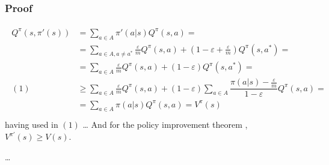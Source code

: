 \documentclass[letterpaper,10pt,english]{jupyterBook}
\begin{document}
\subsubsection*{Proof}
\begin{equation*}
\begin{split}\begin{aligned}
  Q^{\pi}(s, \pi'(s))
  & = \sum_{a \in A} \pi'(a|s) Q^{\pi}(s,a) = \\
  & = \sum_{a \in A, a \ne a^*} \frac{\varepsilon}{m} Q^{\pi}(s,a) + \left( 1 - \varepsilon + \frac{\varepsilon}{m} \right) Q^{\pi}(s,a^*) = \\
  & = \sum_{a \in A} \frac{\varepsilon}{m} Q^{\pi}(s,a) + \left( 1 - \varepsilon \right) Q^{\pi}(s,a^*) = \\
  (1) & \ge \sum_{a \in A} \frac{\varepsilon}{m} Q^{\pi}(s,a) + \left( 1 - \varepsilon \right) \sum_{a \in A} \dfrac{\pi(a|s) - \frac{\varepsilon}{m}}{1 - \varepsilon} Q^{\pi}(s,a) = \\
  & = \sum_{a \in A} \pi(a|s) Q^{\pi}(s,a) = V^{\pi}(s) \\
\end{aligned}\end{split}
\end{equation*}
\sphinxAtStartPar
having used in \((1)\) …
And for the policy improvement theorem {\hyperref[\detokenize{ch/rl/mdp_sol_dp_lp:thm:pi}]{}}, \(V^{\pi'}(s) \ge V(s)\).  

\sphinxAtStartPar
{} …
\end{document}
